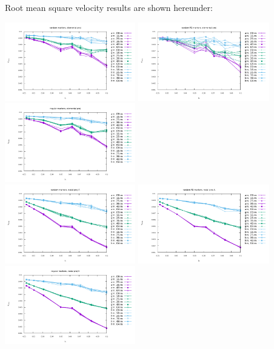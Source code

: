 \newpage
Root mean square velocity results are shown hereunder:
\begin{center}
\includegraphics[width=5.7cm]{python_codes/fieldstone_13/results/vrms_rand_proj1} 
\includegraphics[width=5.7cm]{python_codes/fieldstone_13/results/vrms_poissondisc_proj1} 
\includegraphics[width=5.7cm]{python_codes/fieldstone_13/results/vrms_reg_proj1}\\ 
\includegraphics[width=5.7cm]{python_codes/fieldstone_13/results/vrms_rand_proj2} 
\includegraphics[width=5.7cm]{python_codes/fieldstone_13/results/vrms_poissondisc_proj2} 
\includegraphics[width=5.7cm]{python_codes/fieldstone_13/results/vrms_reg_proj2}\\ 

\end{center}
